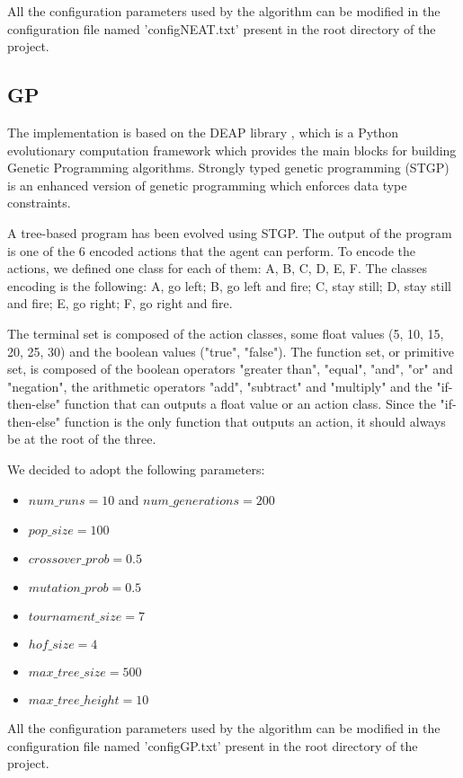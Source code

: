 All the configuration parameters used by the algorithm can be modified in the configuration
file named 'configNEAT.txt' present in the root directory of the project.

\subsection{GP}
The implementation is based on the DEAP library \cite{DEAP}, which is a Python evolutionary
computation framework which provides the main blocks for building Genetic Programming
algorithms. Strongly typed genetic programming (STGP) is an enhanced version of genetic
programming which enforces data type constraints.

A tree-based program has been evolved using STGP. The output of the program is one of
the 6 encoded actions that the agent can perform. To encode the actions, we defined one
class for each of them: A, B, C, D, E, F. The classes encoding is the following:
A, go left; B, go left and fire; C, stay still; D, stay still and fire; E, go right; F, go right and fire.

The terminal set is composed of the action classes, some float values (5, 10, 15, 20, 25, 30)
and the boolean values ("true", "false"). The function set, or primitive set, is composed of the
boolean operators "greater than", "equal", "and", "or" and "negation", the arithmetic operators
"add", "subtract" and "multiply" and the "if-then-else" function that can outputs a float value or
an action class. Since the "if-then-else" function is the only function that outputs an action, it
should always be at the root of the three.

We decided to adopt the following parameters:
\begin{itemize}
    \item $num\_runs = 10$ and $num\_generations = 200$
    \item $pop\_size = 100$
    \item $crossover\_prob = 0.5$
    \item $mutation\_prob = 0.5$
    \item $tournament\_size = 7$
    \item $hof\_size = 4$
    \item $max\_tree\_size = 500$
    \item $max\_tree\_height = 10$
\end{itemize}

All the configuration parameters used by the algorithm can be modified in the configuration
file named 'configGP.txt' present in the root directory of the project.

